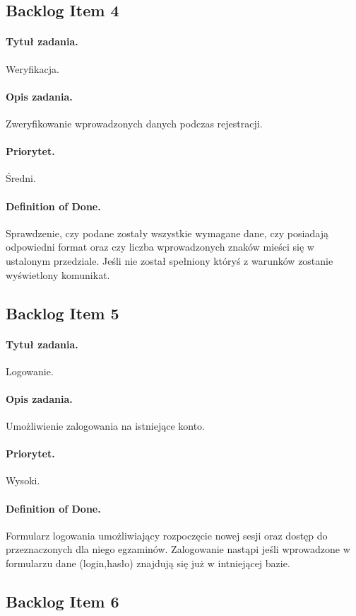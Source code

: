 \documentclass[a4paper]{article}
\begin{document}
\subsection{Backlog Item 4}
\paragraph{Tytuł zadania.} Weryfikacja.
\paragraph{Opis zadania.} Zweryfikowanie wprowadzonych danych podczas rejestracji.
\paragraph{Priorytet.} Średni.
\paragraph{Definition of Done.} Sprawdzenie, czy podane zostały wszystkie wymagane dane, czy posiadają odpowiedni format oraz czy liczba wprowadzonych znaków mieści się w ustalonym przedziale. Jeśli nie został spełniony któryś z warunków zostanie wyświetlony komunikat.

\subsection{Backlog Item 5}
\paragraph{Tytuł zadania.} Logowanie.
\paragraph{Opis zadania.} Umożliwienie zalogowania na istniejące konto.
\paragraph{Priorytet.} Wysoki.
\paragraph{Definition of Done.} Formularz logowania umożliwiający rozpoczęcie nowej sesji oraz dostęp do przeznaczonych dla niego egzaminów. Zalogowanie nastąpi jeśli wprowadzone w formularzu dane (login,hasło) znajdują się już w intniejącej bazie.

\subsection{Backlog Item 6}
\end{document}

